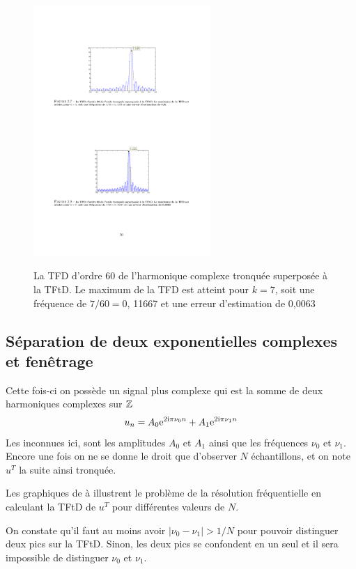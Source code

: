 \begin{figure}
  \centering
  \includegraphics[width=0.6\textwidth]{Figures/Figure2-8}\\
  \caption{La TFD d'ordre 60 de l'harmonique complexe tronqu\'{e}e superpos\'{e}e \`{a} la TFtD. Le maximum de la TFD est atteint pour $k=7$, soit une fr\'{e}quence de $7/60=0$, 11667 et une erreur d'estimation de 0,0063}\label{fig:figure2-8}
\end{figure}




\subsection{S\'{e}paration de deux exponentielles complexes et fen\^{e}trage}
Cette fois-ci on poss\`{e}de un signal plus complexe qui est la somme de deux harmoniques complexes sur $\mathbb{Z}$
$$
u_{n}=A_{0}\mathrm{e}^{2\mathrm{i}\pi\nu_{0}n}+A_{1}\mathrm{e}^{2\mathrm{i}\pi\nu_{1}n}
$$
Les inconnues ici, sont les amplitudes $A_{0}$ et $A_{1}$ ainsi que les fr\'{e}quences $\nu_{0}$ et $\nu_{1}$. Encore une fois on ne se donne le droit que d'observer $N$ \'{e}chantillons, et on note $u^{T}$ la suite ainsi tronqu\'{e}e.


Les graphiques de  \`{a}  illustrent le probl\`{e}me de la r\'{e}solution fr\'{e}quentielle en calculant la TFtD de $u^{T}$ pour diff\'{e}rentes valeurs de $N$.

On constate qu'il faut au moins avoir $|\nu_{0}-\nu_{1}|>1/N$ pour pouvoir distinguer deux pics sur la TFtD. Sinon, les deux pics se confondent en un seul et il sera impossible de distinguer $\nu_{0}$ et $\nu_{1}.$


